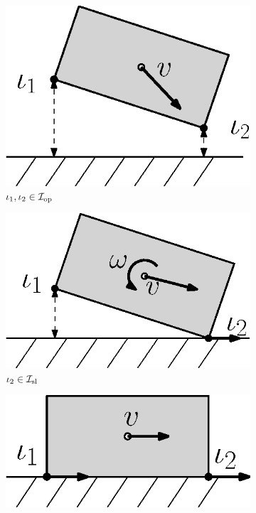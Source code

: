 \documentclass[../DC2017114Bouma.tex]{subfiles}
\begin{document}
\begin{figure}[h]
\centering
\begin{subfigure}[b]{0.17\textwidth}
\centering
\includegraphics[width=\textwidth]{example1.eps}
\caption{$\iota_1,\iota_2\in\mathcal{I}_{\text{op}}$}
\label{fig:2example1}
\end{subfigure}
\quad
\begin{subfigure}[b]{0.17\textwidth}  
\centering 
\includegraphics[width=\textwidth]{example2.eps}
\caption{$\iota_2\in\mathcal{I}_{\text{sl}}$}
\label{fig:2example2}
\end{subfigure}
\quad
\begin{subfigure}[b]{0.17\textwidth}   
\centering 
\includegraphics[width=\textwidth]{example3.eps}

\end{subfigure}
\end{figure}
\end{document}
